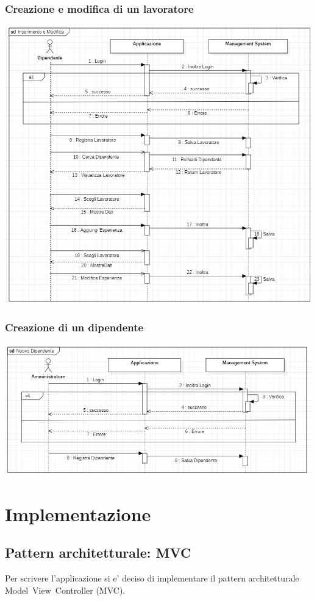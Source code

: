 \documentclass[ 4paper,11pt,openany]{book}
\begin{document}
\subsection{Creazione e modifica di un lavoratore}
\includegraphics[width=180mm]{seq.png}
\subsection{Creazione di un dipendente}
\includegraphics[width=180mm]{seq2.png}


\chapter{Implementazione}%

\section{Pattern architetturale: MVC}
Per scrivere l'applicazione si e' deciso di implementare il pattern architetturale Model~View~Controller (MVC).
\end{document}
